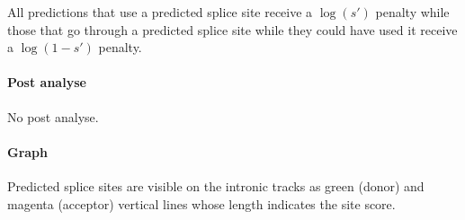 All predictions that use a predicted splice site receive a $\log(s')$
penalty while those that go through a predicted splice site while they
could have used it receive a $\log(1-s')$ penalty.


\paragraph{Post analyse}

No post analyse.

\paragraph{Graph}

Predicted splice sites are visible on the intronic tracks as green
(donor) and magenta (acceptor) vertical lines whose length indicates
the site score.




